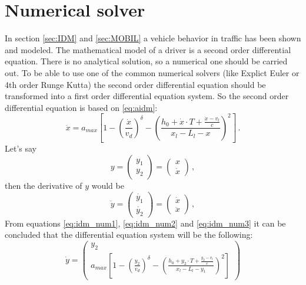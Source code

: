 \documentclass[a4paper,12pt,twoside]{report}
\begin{document}
		\section{Numerical solver}
			In section \ref{sec:IDM} and \ref{sec:MOBIL} a vehicle behavior in traffic has been shown and modeled. The mathematical model of a driver is a second order differential equation. There is no analytical solution, so a numerical one should be carried out. To be able to use one of the common numerical solvers (like Explict Euler or 4th order Runge Kutta) the second order differential equation should be transformed into a first order differential equation system. So the second order differential equation is based on \ref{eq:aidm}:
			\begin{equation}
				\ddot{x}=a_{max}\left [ 1 - \left ( \frac{\dot{x}}{v_d} \right )^\delta - \left ( \frac{h_0 + \dot{x}\cdot T + \frac{\dot{x}-v_l}{c}}{x_l-L_l - x} \right )^2 \right ]\,.
				\label{eq:idm_num1}
			\end{equation}
			Let's say
			\begin{equation}
				y=
				\begin{pmatrix}
					y_1\\
					y_2
				\end{pmatrix}
				=
				\begin{pmatrix}
					x\\
					\dot{x}
				\end{pmatrix}\,,
				\label{eq:idm_num2}
			\end{equation}
			then the derivative of $y$ would be
			\begin{equation}
				\dot{y}=
				\begin{pmatrix}
					\dot{y_1}\\
					\dot{y_2}
				\end{pmatrix}
				=
				\begin{pmatrix}
					\dot{x}\\
					\ddot{x}
				\end{pmatrix}\,,
				\label{eq:idm_num3}
			\end{equation}
			From equations \ref{eq:idm_num1}, \ref{eq:idm_num2} and \ref{eq:idm_num3} it can be concluded that the differential equation system will be the following:
			\begin{equation}
				\dot{y}=
				\begin{pmatrix}
					y_2\\
					a_{max}\left [ 1 - \left ( \frac{y_2}{v_d} \right )^\delta - \left ( \frac{h_0 + y_2\cdot T + \frac{y_2-v_l}{c}}{x_l-L_l - y_1} \right )^2 \right ]
				\end{pmatrix}
				\label{eq:numerical_idm}
			\end{equation}
\end{document}
